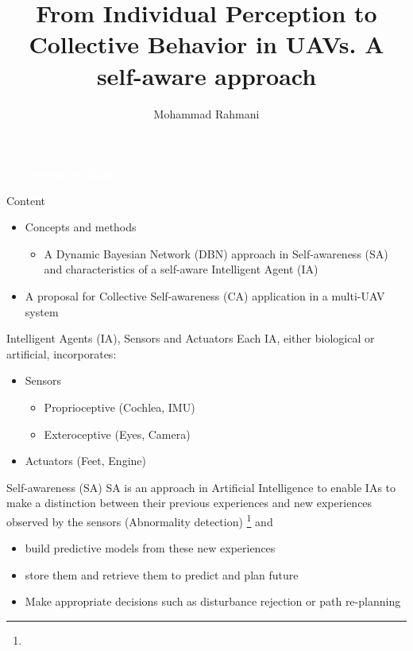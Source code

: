 \documentclass[unknownkeysallowed]{beamer}
\title{From Individual Perception to Collective Behavior in UAVs. A self-aware approach}
\author{Mohammad Rahmani}
\institute{Pervasive Computing Group (Klagenfurt university)}
\begin{document}
	\begin{frame}
		\date{}
		\maketitle
		\textcolor{white}{\textbf{17 September 2020}}
	\end{frame}

	\begin{frame}{Content}
		\begin{itemize}
			\item Concepts and methods
			\begin{itemize}
				\item A Dynamic Bayesian Network (DBN) approach in Self-awareness (SA) and characteristics of a self-aware Intelligent Agent (IA) 
			\end{itemize}
			\item A proposal for Collective Self-awareness (CA) application in a multi-UAV system
		\end{itemize}
	\end{frame}
	
	\begin{frame}{Intelligent Agents (IA), Sensors and Actuators}
		Each IA, either biological or artificial, incorporates:
		\begin{itemize}
			\item Sensors
				\begin{itemize}
					\item Proprioceptive (Cochlea, IMU)
					\item Exteroceptive (Eyes, Camera)
				\end{itemize}
			\item Actuators (Feet, Engine)
		\end{itemize}
	\end{frame}

	\begin{frame}{Self-awareness (SA)}
		SA is an approach in Artificial Intelligence to enable IAs to make a distinction between their previous experiences and new experiences observed by the sensors (Abnormality detection) \footnote{} and
		\begin{itemize}
			\item build predictive models from these new experiences 
			\item store them and retrieve them to predict and plan future
			\item Make appropriate decisions such as disturbance rejection or path re-planning
		\end{itemize}
		
	\end{frame}
\end{document}
